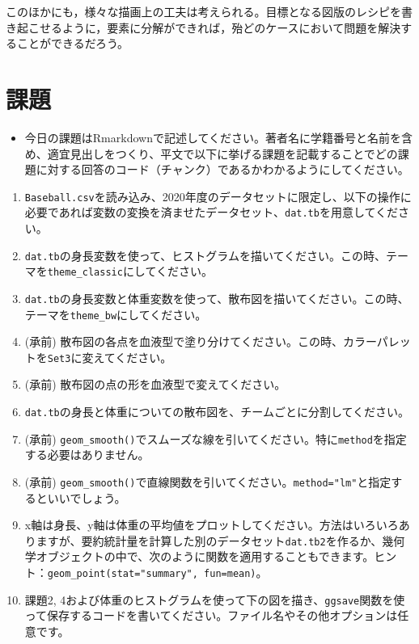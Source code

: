 \documentclass[
  a4paper,
]{ltjsbook}
\providecommand{\tightlist}{%
  \setlength{\itemsep}{0pt}\setlength{\parskip}{0pt}}
\begin{document}
このほかにも，様々な描画上の工夫は考えられる。目標となる図版のレシピを書き起こせるように，要素に分解ができれば，殆どのケースにおいて問題を解決することができるだろう。

\section{課題}\label{ux8ab2ux984c-2}

\begin{itemize}
\tightlist
\item
  今日の課題はRmarkdownで記述してください。著者名に学籍番号と名前を含め、適宜見出しをつくり、平文で以下に挙げる課題を記載することでどの課題に対する回答のコード（チャンク）であるかわかるようにしてください。
\end{itemize}

\begin{enumerate}
\def\labelenumi{\arabic{enumi}.}
\tightlist
\item
  \texttt{Baseball.csv}を読み込み、2020年度のデータセットに限定し、以下の操作に必要であれば変数の変換を済ませたデータセット、\texttt{dat.tb}を用意してください。
\item
  \texttt{dat.tb}の身長変数を使って、ヒストグラムを描いてください。この時、テーマを\texttt{theme\_classic}にしてください。
\item
  \texttt{dat.tb}の身長変数と体重変数を使って、散布図を描いてください。この時、テーマを\texttt{theme\_bw}にしてください。
\item
  (承前)
  散布図の各点を血液型で塗り分けてください。この時、カラーパレットを\texttt{Set3}に変えてください。
\item
  (承前) 散布図の点の形を血液型で変えてください。
\item
  \texttt{dat.tb}の身長と体重についての散布図を、チームごとに分割してください。
\item
  (承前)
  \texttt{geom\_smooth()}でスムーズな線を引いてください。特に\texttt{method}を指定する必要はありません。
\item
  (承前)
  \texttt{geom\_smooth()}で直線関数を引いてください。\texttt{method="lm"}と指定するといいでしょう。
\item
  x軸は身長、y軸は体重の平均値をプロットしてください。方法はいろいろありますが、要約統計量を計算した別のデータセット\texttt{dat.tb2}を作るか、幾何学オブジェクトの中で、次のように関数を適用することもできます。ヒント：\texttt{geom\_point(stat="summary",\ fun=mean)}。
\item
  課題2,
  4および体重のヒストグラムを使って下の図を描き、\texttt{ggsave}関数を使って保存するコードを書いてください。ファイル名やその他オプションは任意です。
\end{enumerate}
\end{document}
